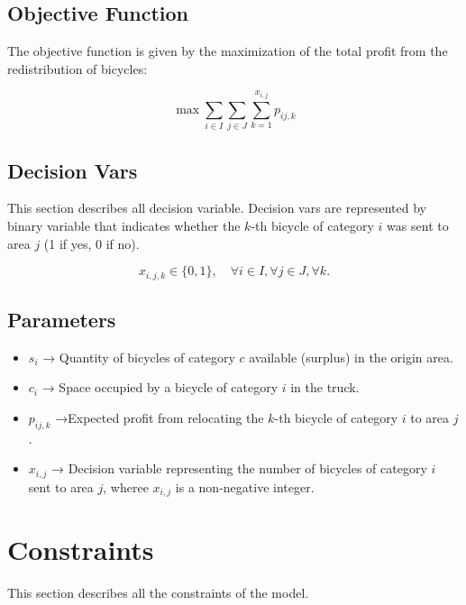 \documentclass[]{article}
\begin{document}
\subsection{Objective Function}

The objective function is given by the maximization of the total profit from the redistribution of bicycles:

\begin{equation}
\max \sum_{i \in I} \sum_{j \in J} \sum_{k=1}^{x_{i,j}} p_{ij,k}
\end{equation}

\subsection{Decision Vars}
This section describes all decision variable. Decision vars are represented by binary variable that indicates whether the \( k \)-th bicycle of category \( i \) was sent to area \( j \) (1 if yes, 0 if no).

\begin{equation}
	x_{i,j,k} \in \{0, 1\}, \quad \forall i \in I, \forall j \in J, \forall k.
\end{equation}

\subsection{Parameters}

\begin{itemize}
	\item $s_i$ → Quantity of bicycles of category 
	$c$ available (surplus) in the origin area.
	\item $c_i$ → Space occupied by a bicycle of category $i$ in the truck.
	\item $p_{ij,k}$ →Expected profit from relocating the 
	$k$-th bicycle of category $i$ to area $j$.
	\item $x_{i,j}$ → Decision variable representing the number of bicycles of category $i$ sent to area $j$, wheree $x_{i,j}$ is a non-negative integer.
\end{itemize}

\section{Constraints}

This section describes all the constraints of the model.
\end{document}
